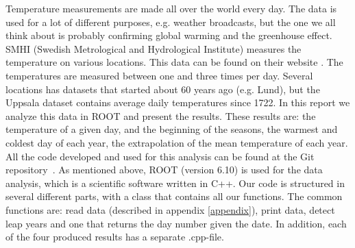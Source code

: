 

Temperature measurements are made all over the world every day. The data is used for a lot of different purposes, e.g. weather broadcasts, but the one we all think about is probably confirming global warming and the greenhouse effect.
SMHI (Swedish Metrological and Hydrological Institute) measures the temperature on various locations. This data can be found on their website \cite{smhidata}. The temperatures are measured between one and three times per day. Several locations has datasets that started about 60 years ago (e.g. Lund), but the Uppsala dataset contains average daily temperatures since 1722. In this report we analyze this data in ROOT and present the results. These results are: the temperature of a given day, and the beginning of the seasons, the warmest and coldest day of each year, the extrapolation of the mean temperature of each year. All the code developed and used for this analysis can be found at the Git repository~\cite{git}.
As mentioned above, ROOT (version 6.10) is used for the data analysis, which is a scientific software written in C++. Our code is structured in several different parts, with a class that contains all our functions. The common functions are: read data (described in appendix \ref{appendix}), print data, detect leap years and one that returns the day number given the date. In addition, each of the four produced results has a separate .cpp-file. 


